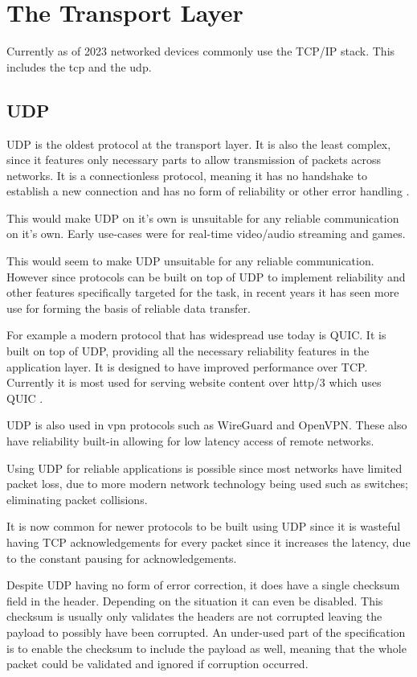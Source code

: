 \section{The Transport Layer}
Currently as of 2023 networked devices commonly use the TCP/IP stack. This includes the \acrfull{tcp} and the \acrfull{udp}.

\subsection*{UDP}
UDP is the oldest protocol at the transport layer. It is also the least complex, since it features only necessary parts to allow transmission of packets across networks. It is a connectionless protocol, meaning it has no handshake to establish a new connection and has no form of reliability or other error handling \parencite{udp-rfc768}.

This would make UDP on it's own is unsuitable for any reliable communication on it's own. Early use-cases were for real-time video/audio streaming and games.

This would seem to make UDP unsuitable for any reliable communication. However since protocols can be built on top of UDP to implement reliability and other features specifically targeted for the task, in recent years it has seen more use for forming the basis of reliable data transfer.

For example a modern protocol that has widespread use today is QUIC. It is built on top of UDP, providing all the necessary reliability features in the application layer. It is designed to have improved performance over TCP. Currently it is most used for serving website content over http/3 which uses QUIC \parencite{carlucci2015http}.

UDP is also used in \acrfull{vpn} protocols such as WireGuard and OpenVPN. These also have reliability built-in allowing for low latency access of remote networks.

Using UDP for reliable applications is possible since most networks have limited packet loss, due to more modern network technology being used such as switches; eliminating packet collisions.

It is now common for newer protocols to be built using UDP since it is wasteful having TCP acknowledgements for every packet since it increases the latency, due to the constant pausing for acknowledgements.

Despite UDP having no form of error correction, it does have a single checksum field in the header. Depending on the situation it can even be disabled. This checksum is usually only validates the headers are not corrupted leaving the payload to possibly have been corrupted. An under-used part of the specification is to enable the checksum to include the payload as well, meaning that the whole packet could be validated and ignored if corruption occurred.

